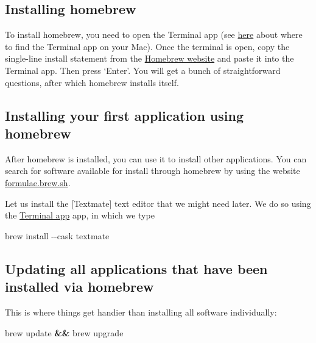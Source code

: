 \documentclass[
]{book}
\newenvironment{Shaded}{\begin{snugshade}}{\end{snugshade}}
\newcommand{\AttributeTok}[1]{\textcolor[rgb]{0.77,0.63,0.00}{#1}}
\newcommand{\ExtensionTok}[1]{#1}
\newcommand{\KeywordTok}[1]{\textcolor[rgb]{0.13,0.29,0.53}{\textbf{#1}}}
\newcommand{\NormalTok}[1]{#1}
\begin{document}
\hypertarget{installing-homebrew}{%
\subsection{Installing homebrew}\label{installing-homebrew}}

To install homebrew, you need to open the Terminal app (see \protect\hyperlink{MacTerminal}{here} about where to find the Terminal app on your Mac). Once the terminal is open, copy the single-line install statement from the \href{https://brew.sh/}{Homebrew website} and paste it into the Terminal app. Then press `Enter'. You will get a bunch of straightforward questions, after which homebrew installs itself.

\hypertarget{installing-your-first-application-using-homebrew}{%
\subsection{Installing your first application using homebrew}\label{installing-your-first-application-using-homebrew}}

After homebrew is installed, you can use it to install other applications. You can search for software available for install through homebrew by using the website \href{https://formulae.brew.sh}{formulae.brew.sh}.

Let us install the {[}Textmate{]} text editor that we might need later. We do so using the \protect\hyperlink{MacTerminal}{Terminal app} app, in which we type

\begin{Shaded}
\begin{Highlighting}[]
\ExtensionTok{brew}\NormalTok{ install }\AttributeTok{{-}{-}cask}\NormalTok{ textmate}
\end{Highlighting}
\end{Shaded}

\hypertarget{updating-all-applications-that-have-been-installed-via-homebrew}{%
\subsection{Updating all applications that have been installed via homebrew}\label{updating-all-applications-that-have-been-installed-via-homebrew}}

This is where things get handier than installing all software individually:

\begin{Shaded}
\begin{Highlighting}[]
\ExtensionTok{brew}\NormalTok{ update }\KeywordTok{\&\&} \ExtensionTok{brew}\NormalTok{ upgrade}
\end{Highlighting}
\end{Shaded}
\end{document}
